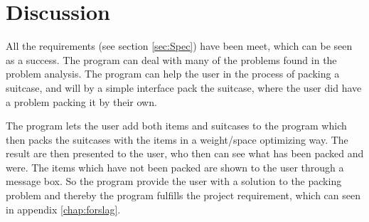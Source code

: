 \section{Discussion}


All the requirements (see section \ref{sec:Spec}) have been meet, which can be seen as a success. The program can deal with many of the problems found in the problem analysis. The program can help the user in the process of packing a suitcase, and will by a simple interface pack the suitcase, where the user did have a problem packing it by their own.



The program lets the user add both items and suitcases to the program which then packs the suitcases with the items in a weight/space optimizing way. The result are then presented to the user, who then can see what has been packed and were. The items which have not been packed are shown to the user through a message box. So the program provide the user with a solution to the packing problem and thereby the program fulfills the project requirement, which can seen in appendix \ref{chap:forslag}.

